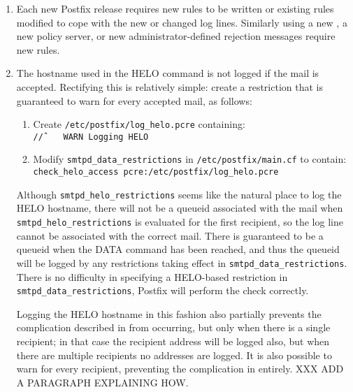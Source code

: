 \begin{enumerate}

    \item Each new Postfix release requires new rules to be written or
        existing rules modified to cope with the new or changed log lines.
        Similarly using a new , a new policy server, or new
        administrator-defined rejection messages require new rules.

    \item The hostname used in the HELO command is not logged if the mail
        is accepted.  Rectifying this is relatively simple: create a
        restriction that is guaranteed to warn for every accepted mail, as
        follows:

        \begin{enumerate}

            \item Create \texttt{/etc/postfix/log\_helo.pcre}
                containing:\newline{}
                \tab{}\texttt{/\^/~~~~WARN~Logging~HELO}

            \item Modify \texttt{smtpd\_data\_restrictions} in
                \texttt{/etc/postfix/main.cf} to contain:\newline{}
                \tab{}\texttt{check\_helo\_access~pcre:/etc/postfix/log\_helo.pcre}

        \end{enumerate}

        Although \texttt{smtpd\_helo\_restrictions} seems like the natural
        place to log the HELO hostname, there will not be a queueid
        associated with the mail when \texttt{smtpd\_helo\_restrictions} is
        evaluated for the first recipient, so the log line cannot be
        associated with the correct mail.  There is guaranteed to be a
        queueid when the DATA command has been reached, and thus the
        queueid will be logged by any restrictions taking effect in
        \texttt{smtpd\_data\_restrictions}.  There is no difficulty in
        specifying a HELO-based restriction in
        \texttt{smtpd\_data\_restrictions}, Postfix will perform the check
        correctly.

        Logging the HELO hostname in this fashion also partially prevents
        the complication described in  from occurring, but only when there is a
        single recipient; in that case the recipient address will be logged
        also, but when there are multiple recipients no addresses are
        logged.  It is also possible to warn for every recipient,
        preventing the complication in  entirely.  XXX ADD A PARAGRAPH EXPLAINING
        HOW\@.


\end{enumerate}
